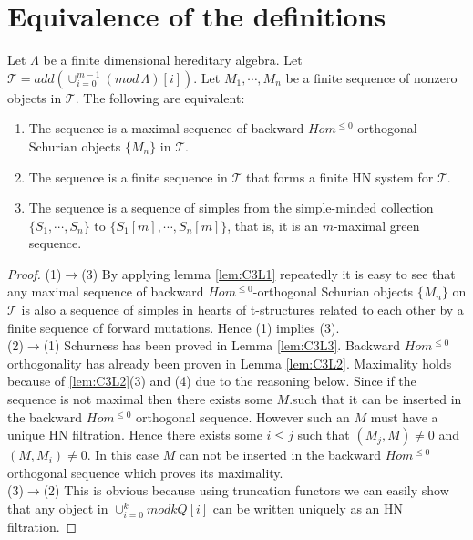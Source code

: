 \section{Equivalence of the definitions}
\begin{theorem}\label{C3TB}
\indent Let $\Lambda$ be a finite dimensional hereditary algebra. Let $\mathcal{T} = add(\cup_{i=0}^{m-1} (mod\,\Lambda)[i])$. Let $M_1,\cdots, M_n$ be a finite sequence of nonzero objects in $\mathcal{T}$. The following are equivalent:
\begin{enumerate}
\item The sequence is a maximal sequence of backward $Hom^{\leq 0}$-orthogonal Schurian objects $\{M_n\}$ in $\mathcal{T}$.
\item The sequence is a finite sequence in $\mathcal{T}$ that forms a finite HN system for $\mathcal{T}$.
\item The sequence is a sequence of simples from the simple-minded collection $\{S_1,\cdots, S_n\}$ to  $\{S_1[m],\cdots, S_n[m]\}$, that is, it is an $m$-maximal green sequence.
\end{enumerate}
\end{theorem}
\begin{proof}
\indent (1)$\to$(3) By applying lemma \ref{lem:C3L1} repeatedly it is easy to see that any maximal sequence of backward $Hom^{\leq 0}$-orthogonal Schurian objects $\{M_n\}$ on $\mathcal{T}$ is also a sequence of simples in hearts of t-structures related to each other by a finite sequence of forward mutations. Hence (1) implies (3).\\
\indent (2)$\to$(1) Schurness has been proved in Lemma \ref{lem:C3L3}. Backward $Hom^{\leq 0}$ orthogonality has already been proven in Lemma \ref{lem:C3L2}. Maximality holds because of \ref{lem:C3L2}(3) and (4) due to the reasoning below. Since if the sequence is not maximal then there exists some $M$.such that it can be inserted in the backward $Hom^{\leq 0}$ orthogonal sequence. However such an $M$ must have a unique HN filtration. Hence there exists some $i\leq j$ such that $(M_j, M)\neq 0$ and $(M, M_i)\neq 0$. In this case $M$ can not be inserted in the backward $Hom^{\leq 0}$ orthogonal sequence which proves its maximality.\\
\indent (3)$\to$(2) This is obvious because using truncation functors we can easily show that any object in $\cup_{i=0}^k mod kQ[i]$ can be written uniquely as an HN filtration. 
\end{proof}